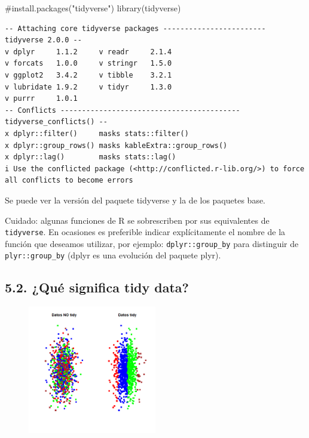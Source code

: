 \documentclass[
  letterpaper,
  DIV=11,
  numbers=noendperiod]{scrreprt}
\newenvironment{Shaded}{\begin{snugshade}}{\end{snugshade}}
\newcommand{\CommentTok}[1]{\textcolor[rgb]{0.37,0.37,0.37}{#1}}
\newcommand{\FunctionTok}[1]{\textcolor[rgb]{0.28,0.35,0.67}{#1}}
\newcommand{\NormalTok}[1]{\textcolor[rgb]{0.00,0.23,0.31}{#1}}
\begin{document}
\begin{Shaded}
\begin{Highlighting}[]
\CommentTok{\#install.packages("tidyverse")}
\FunctionTok{library}\NormalTok{(tidyverse)}
\end{Highlighting}
\end{Shaded}

\begin{verbatim}
-- Attaching core tidyverse packages ------------------------ tidyverse 2.0.0 --
v dplyr     1.1.2     v readr     2.1.4
v forcats   1.0.0     v stringr   1.5.0
v ggplot2   3.4.2     v tibble    3.2.1
v lubridate 1.9.2     v tidyr     1.3.0
v purrr     1.0.1     
-- Conflicts ------------------------------------------ tidyverse_conflicts() --
x dplyr::filter()     masks stats::filter()
x dplyr::group_rows() masks kableExtra::group_rows()
x dplyr::lag()        masks stats::lag()
i Use the conflicted package (<http://conflicted.r-lib.org/>) to force all conflicts to become errors
\end{verbatim}

Se puede ver la versión del paquete tidyverse y la de los paquetes base.

{Cuidado}: algunas funciones de R se sobrescriben por sus equivalentes
de \texttt{tidyverse}. En ocasiones es preferible indicar explícitamente
el nombre de la función que deseamos utilizar, por ejemplo:
\texttt{dplyr::group\_by} para distinguir de \texttt{plyr::group\_by}
(dplyr es una evolución del paquete plyr).

\hypertarget{quuxe9-significa-tidy-data}{%
\subsection{5.2. ¿Qué significa tidy
data?}\label{quuxe9-significa-tidy-data}}

\begin{figure}

{\centering \includegraphics[width=0.5\textwidth,height=\textheight]{Figuras/plot_tidy.png}

}

\end{figure}
\end{document}
